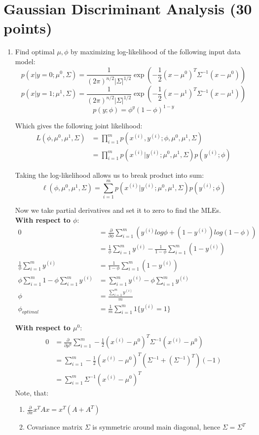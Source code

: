 \documentclass{article}
\newcommand{\ith}{^{(i)}}
\newcommand{\gdafrac}{\frac{1}{(2\pi)^{n/2}|\Sigma|^{1/2}}\exp}
\begin{document}
\section{Gaussian Discriminant Analysis (30 points)}
	\begin{enumerate}		
		\item Find optimal $\mu, \phi$ by maximizing log-likelihood of the following input data model:
		$$p(x|y=0; \mu^0, \Sigma) = \gdafrac(-\frac{1}{2}(x-\mu^0)^T\Sigma^{-1} (x-\mu^0)) $$
		$$p(x|y=1; \mu^1, \Sigma) = \gdafrac(-\frac{1}{2}(x-\mu^1)^T\Sigma^{-1} (x-\mu^1)) $$
		$$p(y; \phi) = \phi^y(1-\phi)^{1-y}$$
		
		Which gives the following joint likelihood:
		\begin{align*}
		L(\phi, \mu^0, \mu^1, \Sigma) &=  \prod_{i=1}^{m} p (x\ith, y\ith; \phi, \mu^0, \mu^1, \Sigma) \\
		&=  \prod_{i=1}^{m} p (x\ith | y\ith; \mu^0, \mu^1, \Sigma) p(y\ith; \phi)
		\end{align*}
		
		Taking the log-likelihood allows us to break product into sum:\\
		$$\ell(\phi, \mu^0, \mu^1, \Sigma) = \sum_{i=1}^{m} p (x\ith | y\ith; \mu^0, \mu^1, \Sigma) p(y\ith; \phi)$$
		
		Now we take partial derivatives and set it to zero to find the MLEs.\\
		\textbf{With respect to $\phi$}:
		\begin{align*}
		0 &=\frac{\partial}{\partial \phi} \sum_{i=1}^{m} (y\ith log \phi + (1-y\ith)log(1-\phi))\\
		&= \frac{1}{\phi} \sum_{i=1}^{m}y\ith - \frac{1}{1 - \phi} \sum_{i=1}^{m}(1 - y\ith)\\
		\frac{1}{\phi} \sum_{i=1}^{m}y\ith &= \frac{1}{1 - \phi} \sum_{i=1}^{m}(1 - y\ith)\\
		\phi \sum_{i=1}^{m}1 - \phi \sum_{i=1}^{m}y\ith &= \sum_{i=1}^{m}y\ith - \phi \sum_{i=1}^{m} y\ith\\
		\phi &= \frac{\sum_{i=1}^{m}y\ith}{m} \\
		\phi_{optimal} &= \frac{1}{m} \sum_{i=1}^{m} 1 \{y\ith = 1\}
		\end{align*}	
		
		\pagebreak
		\textbf{With respect to $\mu^0$}:\\
		\begin{align*}
		0 &=\frac{\partial}{\partial \mu^0} \sum_{i=1}^{m} -\frac{1}{2}(x\ith-\mu^0)^T\Sigma^{-1} (x\ith-\mu^0)\\
		&= \sum_{i=1}^{m} -\frac{1}{2} (x\ith-\mu^0)^T (\Sigma^{-1} + (\Sigma^{-1})^T)(-1)\\
		&= \sum_{i=1}^{m} \Sigma^{-1} (x\ith-\mu^0)^T 
		\end{align*}
		Note, that:
		\begin{enumerate}		
			\item $\frac{\partial}{\partial x} x^T Ax = x^T(A+A^T)$
			\item Covariance matrix $\Sigma$ is symmetric around main diagonal, hence $\Sigma = \Sigma^T$
		\end{enumerate}
		

\end{enumerate}
\end{document}

